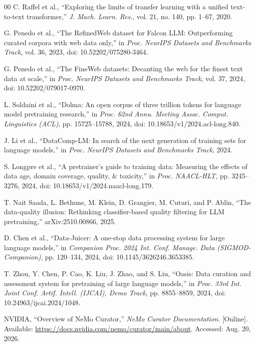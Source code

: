 \documentclass[conference]{IEEEtran}
\begin{document}
\begin{thebibliography}{00}
C. Raffel et al., ``Exploring the limits of transfer learning with a unified
text-to-text transformer,'' \emph{J. Mach. Learn. Res.}, vol. 21, no. 140,
pp. 1--67, 2020.

G. Penedo et al., ``The RefinedWeb dataset for Falcon LLM: Outperforming
curated corpora with web data only,'' in \emph{Proc. NeurIPS Datasets and
Benchmarks Track}, vol. 36, 2023, doi: 10.52202/075280-3464.

G. Penedo et al., ``The FineWeb datasets: Decanting the web for the finest
text data at scale,'' in \emph{Proc. NeurIPS Datasets and Benchmarks Track},
vol. 37, 2024, doi: 10.52202/079017-0970.

L. Soldaini et al., ``Dolma: An open corpus of three trillion tokens for
language model pretraining research,'' in \emph{Proc. 62nd Annu. Meeting Assoc.
Comput. Linguistics (ACL)}, pp. 15725--15788, 2024,
doi: 10.18653/v1/2024.acl-long.840.

J. Li et al., ``DataComp-LM: In search of the next generation of training sets
for language models,'' in \emph{Proc. NeurIPS Datasets and Benchmarks Track},
2024.

S. Longpre et al., ``A pretrainer's guide to training data: Measuring the
effects of data age, domain coverage, quality, \& toxicity,'' in
\emph{Proc. NAACL-HLT}, pp. 3245--3276, 2024,
doi: 10.18653/v1/2024.naacl-long.179.

T. Nait Saada, L. Bethune, M. Klein, D. Grangier, M. Cuturi, and P. Ablin,
``The data-quality illusion: Rethinking classifier-based quality filtering for
LLM pretraining,'' arXiv:2510.00866, 2025.

D. Chen et al., ``Data-Juicer: A one-stop data processing system for large
language models,'' in \emph{Companion Proc. 2024 Int. Conf. Manage. Data
(SIGMOD-Companion)}, pp. 120--134, 2024,
doi: 10.1145/3626246.3653385.

T. Zhou, Y. Chen, P. Cao, K. Liu, J. Zhao, and S. Liu, ``Oasis: Data curation
and assessment system for pretraining of large language models,'' in
\emph{Proc. 33rd Int. Joint Conf. Artif. Intell. (IJCAI), Demo Track},
pp. 8855--8859, 2024, doi: 10.24963/ijcai.2024/1048.

NVIDIA, ``Overview of NeMo Curator,'' \emph{NeMo Curator Documentation}.
[Online]. Available: \url{https://docs.nvidia.com/nemo/curator/main/about}.
Accessed: Aug. 20, 2026.


\end{thebibliography}
\end{document}
